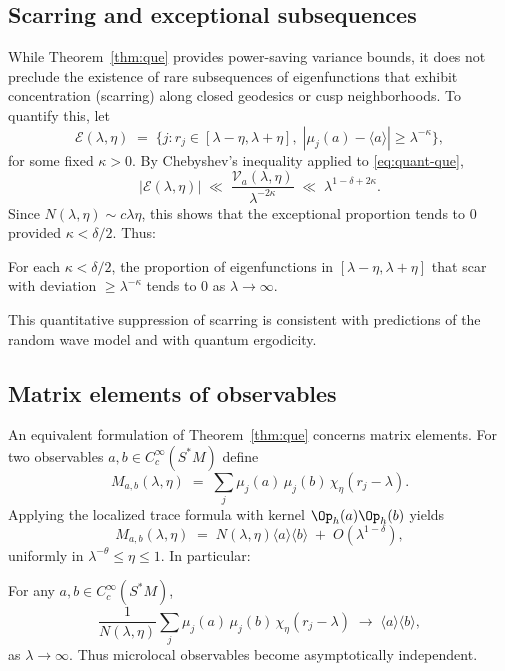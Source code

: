 \subsection{Scarring and exceptional subsequences}
While Theorem~\ref{thm:que} provides power-saving variance bounds, it does not preclude the existence of rare subsequences of eigenfunctions that exhibit concentration (scarring) along closed geodesics or cusp neighborhoods. To quantify this, let
\[
\mathcal{E}(\lambda,\eta)\;=\;\big\{ j : r_j\in [\lambda-\eta,\lambda+\eta],\; |\mu_j(a)-\langle a\rangle| \ge \lambda^{-\kappa}\big\},
\]
for some fixed $\kappa>0$. By Chebyshev’s inequality applied to \eqref{eq:quant-que},
\[
|\mathcal{E}(\lambda,\eta)| \;\ll\; \frac{\mathcal{V}_a(\lambda,\eta)}{\lambda^{-2\kappa}}
\;\ll\;\lambda^{1-\delta+2\kappa}.
\]
Since $N(\lambda,\eta)\sim c\lambda\eta$, this shows that the exceptional proportion tends to $0$ provided $\kappa<\delta/2$. Thus:

\begin{corollary}\label{cor:scarring}
For each $\kappa<\delta/2$, the proportion of eigenfunctions in $[\lambda-\eta,\lambda+\eta]$ that scar with deviation $\ge\lambda^{-\kappa}$ tends to $0$ as $\lambda\to\infty$.
\end{corollary}

This quantitative suppression of scarring is consistent with predictions of the random wave model and with quantum ergodicity.

\subsection{Matrix elements of observables}
An equivalent formulation of Theorem~\ref{thm:que} concerns matrix elements. For two observables $a,b\in C_c^\infty(S^*M)$ define
\[
M_{a,b}(\lambda,\eta)\;=\;\sum_j \mu_j(a)\,\mu_j(b)\,\chi_\eta(r_j-\lambda).
\]
Applying the localized trace formula with kernel $\Op_h(a)\Op_h(b)$ yields
\begin{equation}\label{eq:matrix-element}
M_{a,b}(\lambda,\eta)\;=\;N(\lambda,\eta)\langle a\rangle \langle b\rangle
\;+\;O(\lambda^{1-\delta}),
\end{equation}
uniformly in $\lambda^{-\theta}\le \eta\le 1$. In particular:

\begin{corollary}\label{cor:decay}
For any $a,b\in C_c^\infty(S^*M)$,
\[
\frac{1}{N(\lambda,\eta)}\sum_j \mu_j(a)\,\mu_j(b)\,\chi_\eta(r_j-\lambda)
\;\to\;\langle a\rangle \langle b\rangle,
\]
as $\lambda\to\infty$. Thus microlocal observables become asymptotically independent.
\end{corollary}

